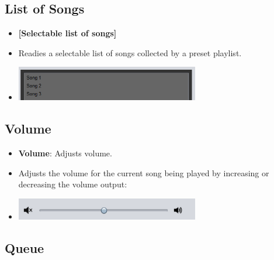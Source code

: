 \documentclass{article}
\begin{document}
\subsection{List of Songs}

\begin{itemize}
    \item \textbf{[Selectable list of songs]}
        \item[] Readies a selectable list of songs collected by a preset playlist.
        \item[] \includegraphics[width=8cm]{Images/ListOfSongs.png}
\end{itemize}

\subsection{Volume}

\begin{itemize}
    \item \textbf{Volume}: Adjusts volume.
        \item[] Adjusts the volume for the current song being played by increasing or decreasing the volume output:
        \item[] \includegraphics[width=8cm]{Images/Volume.png}
\end{itemize}

\subsection{Queue}
\end{document}
